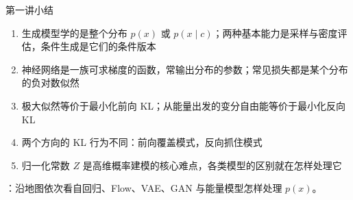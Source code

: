\documentclass[aspectratio=169,10pt,UTF8,fontset=none]{ctexbeamer}
\begin{document}
\begin{frame}{第一讲小结}
  \begin{takeaway}[带走的几件事]
    \begin{enumerate}
      \item 生成模型学的是整个分布 $p(x)$ 或 $p(x\mid c)$；两种基本能力是采样与密度评估，条件生成是它们的条件版本
      \item 神经网络是一族可求梯度的函数，常输出分布的参数；常见损失都是某个分布的负对数似然
      \item 极大似然等价于最小化前向 KL；从能量出发的变分自由能等价于最小化反向 KL
      \item 两个方向的 KL 行为不同：前向覆盖模式，反向抓住模式
      \item 归一化常数 $Z$ 是高维概率建模的核心难点，各类模型的区别就在怎样处理它
    \end{enumerate}
  \end{takeaway}
  \vspace{3mm}
  ：沿地图依次看自回归、Flow、VAE、GAN 与能量模型怎样处理 $p(x)$。
\end{frame}
\end{document}
